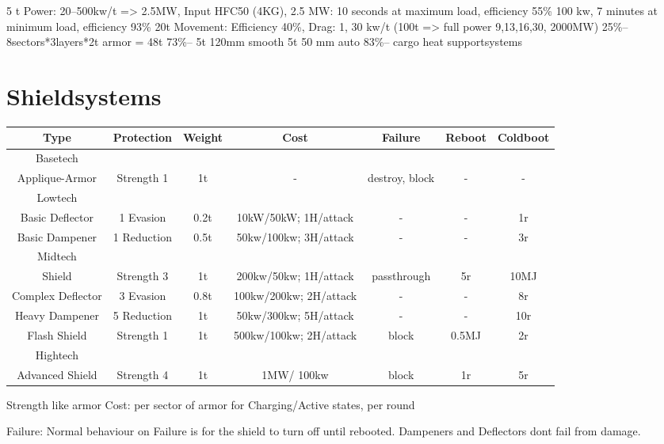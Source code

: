 5 t Power: 20--500kw/t => 2.5MW, Input HFC50 (4KG),
2.5 MW: 10 seconds at maximum load, efficiency 55\%
100 kw, 7 minutes at minimum load, efficiency 93\%
20t Movement: Efficiency 40\%, Drag: 1, 30 kw/t
(100t => full power 9,13,16,30, 2000MW)
25\%--
8sectors*3layers*2t armor = 48t
73\%--
5t 120mm smooth
5t 50 mm auto
83\%--
cargo
heat
supportsystems



\section{Shieldsystems}\label{sec:shieldsystems}
\begin{tabular}{c|cccccc}
    Type & Protection &Weight& Cost & Failure  & Reboot & Coldboot \\
    \hline Basetech\\
    Applique-Armor & Strength 1 & 1t & - & destroy, block & - & - \\
    \hline Lowtech\\
    Basic Deflector & 1 Evasion & 0.2t & 10kW/50kW;
    1H/attack & - & - & 1r\\
    Basic Dampener & 1 Reduction & 0.5t & 50kw/100kw;
    3H/attack & - & - & 3r \\
    \hline Midtech\\
    Shield & Strength 3 & 1t & 200kw/50kw;
    1H/attack & passthrough & 5r & 10MJ \\
    Complex Deflector & 3 Evasion & 0.8t & 100kw/200kw;
    2H/attack & - & - & 8r\\
    Heavy Dampener & 5 Reduction & 1t & 50kw/300kw;
    5H/attack & - & - & 10r\\
    Flash Shield & Strength 1 & 1t & 500kw/100kw;
    2H/attack & block & 0.5MJ & 2r\\
    \hline Hightech\\
    Advanced Shield & Strength 4 & 1t & 1MW/ 100kw & block & 1r & 5r \\
\end{tabular}\par

Strength like armor
Cost:  per sector of armor for Charging/Active states, per round\par
Failure: Normal behaviour on Failure is for the shield to turn off until rebooted.
Dampeners and Deflectors dont fail from damage.

